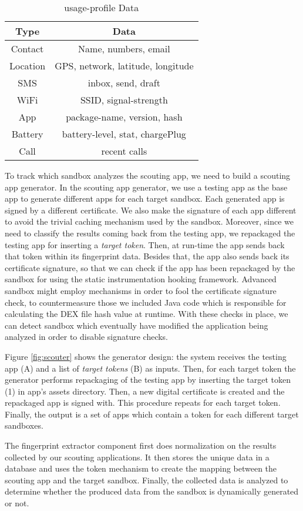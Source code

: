 \begin{table}
\centering
\caption{ usage-profile Data }
\begin{tabular}{|c|c|} \hline
Type&Data\\ \hline
Contact & Name, numbers, email\\ \hline
Location & GPS, network, latitude, longitude \\ \hline
SMS & inbox, send, draft\\ \hline
WiFi & SSID, signal-strength  \\ \hline
App & package-name, version, hash \\ \hline
Battery & battery-level, stat, chargePlug \\ \hline
Call & recent calls \\
\hline
\end{tabular}
\label{tab:data}
\end{table}

To track which sandbox analyzes the scouting app, we need to build a scouting app generator. In the scouting app generator, we use a testing app as the base app to generate different apps for each target sandbox. Each generated app is signed by a different certificate. We also make the signature of each app different to avoid the trivial caching mechanism used by the sandbox. Moreover, since we need to classify the results coming back from the testing app, we repackaged the testing app for inserting a \textit{target token}. Then, at run-time the app sends back that token within its fingerprint data. Besides that, the app also sends back its certificate signature, so that we can check if the app has been repackaged by the sandbox for using the static instrumentation hooking framework. Advanced sandbox might employ mechanisms in order to fool the certificate signature check, to countermeasure those we included Java code which is responsible for calculating the DEX file hash value at runtime. With these checks in place, we can detect sandbox which eventually have modified the application being analyzed in order to disable signature checks. 

Figure \ref{fig:scouter} shows the generator design: the system receives the testing app (A) and a list of \textit{target tokens} (B) as inputs. Then, for each target token the generator performs repackaging of the testing app by inserting the target token (1) in app's assets directory. Then, a new digital certificate is created and the repackaged app is signed with. This procedure repeats for each target token. Finally, the output is a set of apps which contain a token for each different target sandboxes.


The fingerprint extractor component first does normalization on the results collected by our scouting applications. It then stores the unique data in a database and uses the token mechanism to create the mapping between the scouting app and the target sandbox. Finally, the collected data is analyzed to determine whether the produced data from the sandbox is dynamically generated or not.